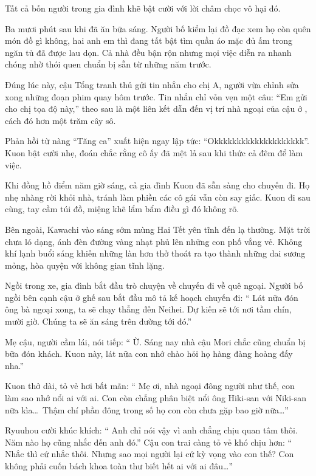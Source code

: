 \documentclass[../main.tex]{subfiles}
\begin{document}
Tất cả bốn người trong gia đình khẽ bật cười với lời châm chọc vô hại đó.

\ct

Ba mươi phút sau khi đã ăn bữa sáng. Người bố kiểm lại đồ đạc xem họ còn quên món đồ gì không, hai anh em thì đang tất bật tìm quần áo mặc đủ ấm trong ngăn tủ đã được lau dọn. Cả nhà đều bận rộn nhưng mọi việc diễn ra nhanh chóng nhờ thói quen chuẩn bị sẵn từ những năm trước.

Đúng lúc này, cậu Tổng tranh thủ gửi tin nhắn cho chị A, người vừa chỉnh sửa xong những đoạn phim quay hôm trước. Tin nhắn chỉ vỏn vẹn một câu: ``Em gửi cho chị tọa độ này,'' theo sau là một liên kết dẫn đến vị trí nhà ngoại của cậu ở , cách đó hơn một trăm cây sô.

Phản hồi từ nàng ``Tăng ca'' xuất hiện ngay lập tức: ``Okkkkkkkkkkkkkkkkkkkk''. Kuon bật cười nhẹ, đoán chắc rằng cô ấy đã mệt lả sau khi thức cả đêm để làm việc.

\ct

Khi đồng hồ điểm năm giờ sáng, cả gia đình Kuon đã sẵn sàng cho chuyến đi. Họ nhẹ nhàng rời khỏi nhà, tránh làm phiền các cô gái vẫn còn say giấc. Kuon đi sau cùng, tay cầm túi đồ, miệng khẽ lẩm bẩm điều gì đó không rõ.

Bên ngoài, Kawachi vào sáng sớm mùng Hai Tết yên tĩnh đến lạ thường. Mặt trời chưa ló dạng, ánh đèn đường vàng nhạt phủ lên những con phố vắng vẻ. Không khí lạnh buổi sáng khiến những làn hơn thở thoát ra tạo thành những dai sương mỏng, hòa quyện với không gian tĩnh lặng.

Ngồi trong xe, gia đình bắt đầu trò chuyện về chuyến đi về quê ngoại. Người bố ngồi bên cạnh cậu ở ghế sau bắt đầu mô tả kế hoạch chuyến đi: ``{\color{red} Lát nữa đón ông bà ngoại xong, ta sẽ chạy thẳng đến Neihei. Dự kiến sẽ tới nơi tầm chín, mười giờ. Chúng ta sẽ ăn sáng trên đường tới đó.}''

Mẹ cậu, người cầm lái, nói tiếp: ``{\color{red} Ừ. Sáng nay nhà cậu Mori chắc cũng chuẩn bị bữa đón khách. Kuon này, lát nữa con nhớ chào hỏi họ hàng đàng hoàng đấy nha.}''

Kuon thở dài, tỏ vẻ hơi bất mãn: ``{\color{red} Mẹ ơi, nhà ngoại đông người như thế, con làm sao nhớ nổi ai với ai. Con còn chẳng phân biệt nổi ông Hiki-san với Niki-san nữa kìa\dots\ Thậm chí phần đông trong số họ con còn chưa gặp bao giờ nữa\dots}''

Ryuuhou cười khúc khích: ``{\color{red} Anh chỉ nói vậy vì anh chẳng chịu quan tâm thôi. Năm nào họ cũng nhắc đến anh đó.}'' Cậu con trai càng tỏ vẻ khó chịu hơn: ``{\color{red} Nhắc thì cứ nhắc thôi. Nhưng sao mọi người lại cứ kỳ vọng vào con thế? Con không phải cuốn bách khoa toàn thư biết hết ai với ai đâu\dots}''
\end{document}

